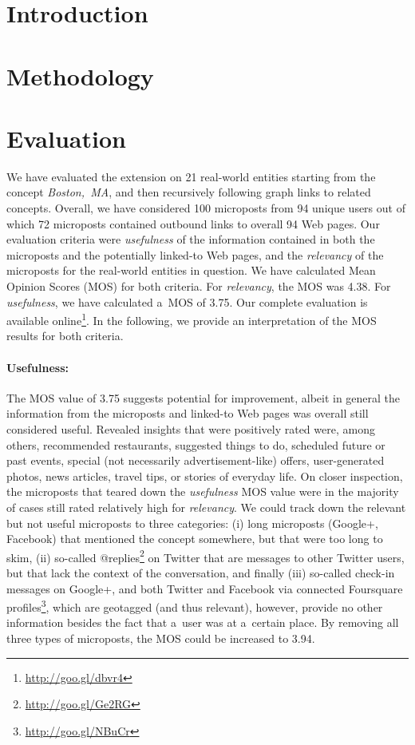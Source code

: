 \documentclass[runningheads,a4paper]{llncs}
\begin{document}
\section{Introduction}

\section{Methodology}

\section{Evaluation}
We have evaluated the extension on 21 real-world entities starting from the concept
\emph{Boston,~MA}, and then recursively following graph links to related concepts.
Overall, we have considered 100 microposts from 94 unique users
out of which 72 microposts contained outbound links to overall 94 Web pages.
Our evaluation criteria were \emph{usefulness} of the information
contained in both the microposts and the potentially linked-to Web pages,
and the \emph{relevancy} of the microposts for the real-world entities in question.
We have calculated Mean Opinion Scores (MOS) for both criteria.
For \emph{relevancy}, the MOS was 4.38.
For \emph{usefulness}, we have calculated a~MOS of 3.75.
Our complete evaluation is available online\footnote{\url{http://goo.gl/dbvr4}}.
In the following, we provide an interpretation of the MOS results for both criteria.

\paragraph{Usefulness:}
The MOS value of 3.75 suggests potential for improvement,
albeit in general the information from the microposts and linked-to Web pages
was overall still considered useful.
Revealed insights that were positively rated were, among others, recommended restaurants,
suggested things to do, scheduled future or past events,
special (not necessarily advertisement-like) offers, user-generated photos,
news articles, travel tips, or stories of everyday life.
On closer inspection, the microposts that teared down the \emph{usefulness} MOS value
were in the majority of cases still rated relatively high for \emph{relevancy}.
We could track down the relevant but not useful microposts to three categories:
(i) long microposts (Google+, Facebook) that mentioned the concept somewhere,
but that were too long to skim,
(ii) so-called
@replies\footnote{\url{http://goo.gl/Ge2RG}}
on Twitter that are messages to other Twitter users,
but that lack the context of the conversation, and finally
(iii) so-called check-in messages on Google+, and both Twitter and Facebook
via connected Foursquare profiles\footnote{\url{http://goo.gl/NBuCr}},
which are geotagged (and thus relevant), however,
provide no other information besides the fact that a~user was at a~certain place.
By removing all three types of microposts, the MOS could be increased to 3.94.
\end{document}
